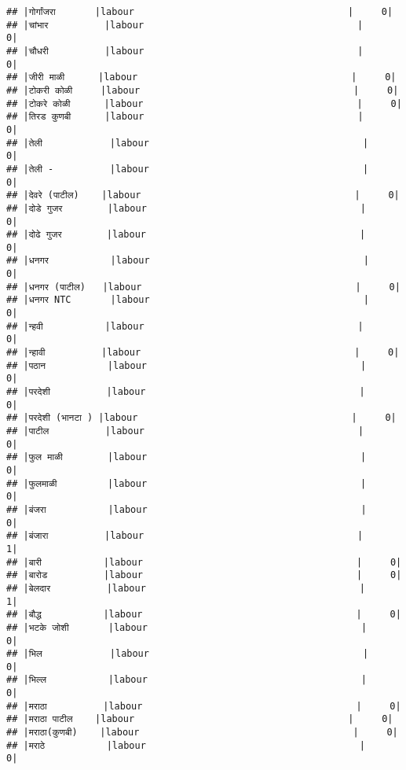 \documentclass[
]{article}
\begin{document}
\begin{verbatim}
## |गोर्गांजरा       |labour                                      |     0|
## |चांभार          |labour                                      |     0|
## |चौधरी          |labour                                      |     0|
## |जीरी माळी      |labour                                      |     0|
## |टोकरी कोळी     |labour                                      |     0|
## |टोकरे कोळी      |labour                                      |     0|
## |तिरड कुणबी      |labour                                      |     0|
## |तेली            |labour                                      |     0|
## |तेली -          |labour                                      |     0|
## |देवरे (पाटील)    |labour                                      |     0|
## |दोडे गुजर        |labour                                      |     0|
## |दोढे गुजर        |labour                                      |     0|
## |धनगर           |labour                                      |     0|
## |धनगर (पाटील)   |labour                                      |     0|
## |धनगर NTC       |labour                                      |     0|
## |न्हवी           |labour                                      |     0|
## |न्हावी          |labour                                      |     0|
## |पठान           |labour                                      |     0|
## |परदेशी          |labour                                      |     0|
## |परदेशी (भानटा ) |labour                                      |     0|
## |पाटील          |labour                                      |     0|
## |फुल माळी        |labour                                      |     0|
## |फुलमाळी         |labour                                      |     0|
## |बंजरा           |labour                                      |     0|
## |बंजारा          |labour                                      |     1|
## |बारी           |labour                                      |     0|
## |बारोड          |labour                                      |     0|
## |बेलदार          |labour                                      |     1|
## |बौद्ध           |labour                                      |     0|
## |भटके जोशी       |labour                                      |     0|
## |भिल            |labour                                      |     0|
## |भिल्ल           |labour                                      |     0|
## |मराठा          |labour                                      |     0|
## |मराठा पाटील    |labour                                      |     0|
## |मराठा(कुणबी)    |labour                                      |     0|
## |मराठे           |labour                                      |     0|

\end{verbatim}
\end{document}
